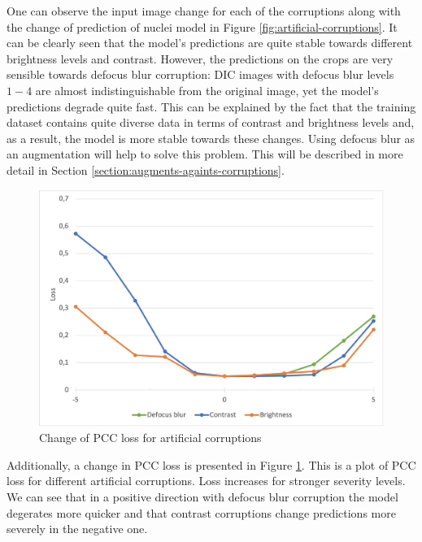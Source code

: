 One can observe the input image change for each of the corruptions along with the change of prediction of nuclei model in Figure \ref{fig:artificial-corruptions}. It can be clearly seen that the model's predictions are quite stable towards different brightness levels and contrast. However, the predictions on the crops are very sensible towards defocus blur corruption: DIC images with defocus blur levels $1-4$ are almost indistinguishable from the original image, yet the model's predictions degrade quite fast. This can be explained by the fact that the training dataset contains quite diverse data in terms of contrast and brightness levels and, as a result, the model is more stable towards these changes. Using defocus blur as an augmentation will help to solve this problem. This will be described in more detail in Section \ref{section:augments-againts-corruptions}.
\begin{figure}[H]
	\begin{center}
		\includegraphics[width=0.5\linewidth]{bilder/corruptions-loss.png}
		\caption{Change of PCC loss for artificial corruptions}\label{fig:corruptions-loss}
	\end{center}
\end{figure}

Additionally, a change in PCC loss is presented in Figure \ref{fig:corruptions-loss}. This is a plot of PCC loss for different artificial corruptions. Loss increases for stronger severity levels. We can see that in a positive direction with defocus blur corruption the model degerates more quicker and that contrast corruptions change predictions more severely in the negative one.